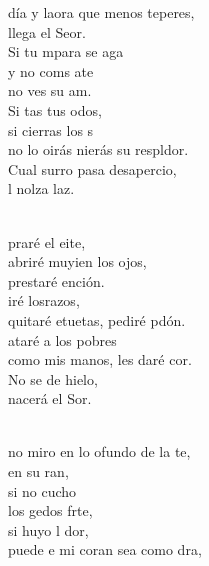 \documentclass[12pt]{article}
\begin{document}
\begin{multicols*}{2}
\begin{cancion}%
	día y laora que menos teperes,\\
	llega el Seor. \\
	Si tu mpara se aga  \\
	y no coms ate\\
	no ves su am. \\
	Si tas tus odos, \\
	si cierras los s\\
	no lo oirás nierás su respldor.\\
	Cual surro pasa desapercio,\\
	l nolza laz.\\\jump\\
	\begin{chorus}%
	praré el eite, \\
	abriré muyien los ojos, \\
	prestaré ención.\\
	iré losrazos, \\
	quitaré etuetas, pediré pdón.\\
	ataré a los pobres \\
	como mis manos, les daré cor.\\
	No se de hielo,  \\
	nacerá el Sor.\\
	\end{chorus}%
	\jump\\
	no miro en lo ofundo de la te, \\
	en su ran,\\
	si no cucho \\
	los gedos  frte,\\
	si huyo l dor,\\
	puede e mi coran sea como dra, \\

\end{cancion}
\end{multicols*}
\end{document}
